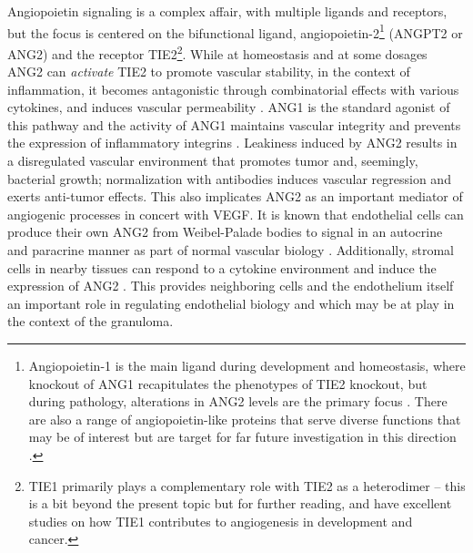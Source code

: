 Angiopoietin signaling is a complex affair, with multiple ligands and receptors, but the focus is centered on the bifunctional ligand, angiopoietin\hyp{}2\footnote{Angiopoietin\hyp{}1 is the main ligand during development and homeostasis, where knockout of ANG1 recapitulates the phenotypes of TIE2 knockout, but during pathology, alterations in ANG2 levels are the primary focus \citep{Akwii2021}. There are also a range of angiopoietin\hyp{}like proteins that serve diverse functions that may be of interest but are target for far future investigation in this direction \citep{Hato2008}.} (ANGPT2 or ANG2) and the receptor TIE2\footnote{TIE1 primarily plays a complementary role with TIE2 as a heterodimer -- this is a bit beyond the present topic but for further reading, \citet{Savant2015} and \citet{LaPorta2018} have excellent studies on how TIE1 contributes to angiogenesis in development and cancer.}. While at homeostasis and at some dosages ANG2 can \textit{activate} TIE2 to promote vascular stability, in the context of inflammation, it becomes antagonistic through combinatorial effects with various cytokines, and induces vascular permeability \citep{Augustin2009}. ANG1 is the standard agonist of this pathway and the activity of ANG1 maintains vascular integrity and prevents the expression of inflammatory integrins \citep{Augustin2009}. Leakiness induced by ANG2 results in a disregulated vascular environment that promotes tumor and, seemingly, bacterial growth; normalization with antibodies induces vascular regression and exerts anti\hyp{}tumor effects. This also implicates ANG2 as an important mediator of angiogenic processes in concert with VEGF. It is known that endothelial cells can produce their own ANG2 from Weibel-Palade bodies to signal in an autocrine and paracrine manner as part of normal vascular biology \citep{Fiedler2004}. Additionally, stromal cells in nearby tissues can respond to a cytokine environment and induce the expression of ANG2 \citep{Huang2010, Hato2008, Thurston2012}. This provides neighboring cells and the endothelium itself an important role in regulating endothelial biology and which may be at play in the context of the granuloma.

